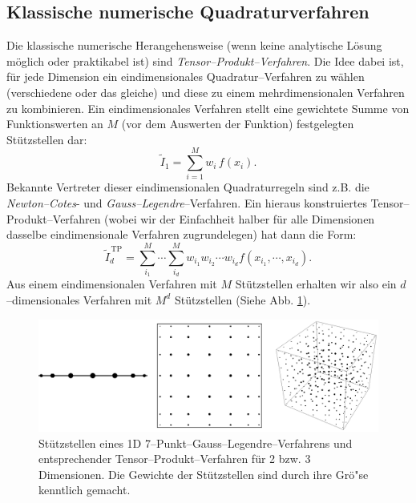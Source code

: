 	\subsection{Klassische numerische Quadraturverfahren}
	Die klassische numerische Herangehensweise (wenn keine analytische Lösung möglich oder praktikabel ist) sind {\em Tensor--Produkt--Verfahren}. Die Idee dabei ist, für jede Dimension ein eindimensionales Quadratur--Verfahren zu wählen (verschiedene oder das gleiche) und diese zu einem mehrdimensionalen Verfahren zu kombinieren. Ein eindimensionales Verfahren stellt eine gewichtete Summe von Funktionswerten an $M$ (vor dem Auswerten der Funktion) festgelegten Stützstellen dar:
	$${\tilde I}_1=\sum_{i=1}^M w_i\,f(x_i).$$
	Bekannte Vertreter dieser eindimensionalen Quadraturregeln sind z.B. die {\em Newton--Cotes}- und {\em Gauss--Legendre}--Verfahren. Ein hieraus konstruiertes Tensor--Produkt--Verfahren (wobei wir der Einfachheit halber für alle Dimensionen dasselbe eindimensionale Verfahren zugrundelegen) hat dann die Form:
	$${\tilde I}_d^{\,\text{TP}}=\sum_{i_1}^M\cdots\sum_{i_d}^M w_{i_1}w_{i_2}\cdots w_{i_d}f(x_{i_1},\cdots,x_{i_d}).$$
	Aus einem eindimensionalen Verfahren mit $M$ Stützstellen erhalten wir also ein $d$--dimensionales Verfahren mit $M^d$ Stützstellen (Siehe Abb. {\ref{fig:tensorproduct}}).
	\begin{figure}
		\centering
		\includegraphics[height=0.25\textheight]{tensorproduct_quadrature.eps}
		\caption{Stützstellen eines 1D 7--Punkt--Gauss--Legendre--Verfahrens und entsprechender Tensor--Produkt--Verfahren für 2 bzw. 3 Dimensionen. Die Gewichte der Stützstellen sind durch ihre Grö"se kenntlich gemacht.}
		\label{fig:tensorproduct}
	\end{figure}
	
